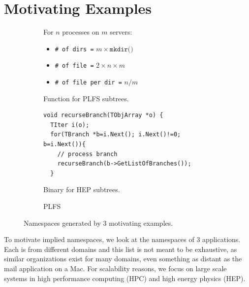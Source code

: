 \section{Motivating Examples}


\begin{figure}[t]
  \centering
  \begin{subfigure}[b]{.3\linewidth}
      \centering
For \(n\) processes on \(m\) servers:

\begin{itemize}
  \item[] \texttt{\# of dirs =} \(m \times \texttt{mkdir()}\)
  \item[] \texttt{\# of file =} \(2 \times n \times m\)
  \item[] \texttt{\# of file per dir =} \(n/m\)
\end{itemize}
      \caption{Function for PLFS subtrees.} \label{fig:plfs}
  \end{subfigure}
  \begin{subfigure}[b]{.3\linewidth}
      \centering
      \footnotesize
      \begin{verbatim}
void recurseBranch(TObjArray *o) {
  TIter i(o); 
  for(TBranch *b=i.Next(); i.Next()!=0; b=i.Next()){
    // process branch
    recurseBranch(b->GetListOfBranches());
  }
      \end{verbatim}
      \caption{Binary for HEP subtrees.} \label{fig:plfs}
  \end{subfigure}
  \begin{subfigure}[b]{.3\linewidth}
      \centering
      \caption{PLFS} \label{fig:plfs}
  \end{subfigure}
\caption{Namespaces generated by 3 motivating examples.\label{fig:use-cases}}
\end{figure}


To motivate implied namespaces, we look at the namespaces of 3 applications.
Each is from different domains and this list is not meant to be exhaustive, as
similar organizations exist for many domains, even something as distant as the
mail application on a Mac. For scalability reasons, we focus on large scale
systems in high performance computing (HPC) and high energy physics (HEP).

